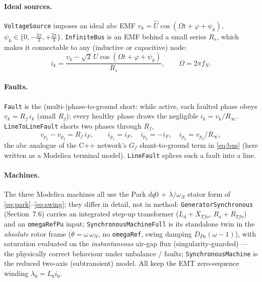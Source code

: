 \documentclass[11pt]{article}
\begin{document}
\paragraph{Ideal sources.} \texttt{VoltageSource} imposes an ideal abc EMF
$v_k=\hat U\cos(\Omega t+\varphi+\psi_k)$, $\psi_k\in\{0,-\tfrac{2\pi}{3},
+\tfrac{2\pi}{3}\}$. \texttt{InfiniteBus} is an EMF behind a small series $R_s$,
which makes it connectable to any (inductive or capacitive) node:
\begin{equation}
i_k=\frac{v_k-\sqrt2\,U\cos(\Omega t+\varphi+\psi_k)}{R_s},
\qquad \Omega=2\pi f_N .
\label{eq:infbus}
\end{equation}

\paragraph{Faults.} \texttt{Fault} is the (multi-)phase-to-ground short: while
active, each faulted phase obeys $v_k=R_f\,i_k$ (small $R_f$); every healthy phase
draws the negligible $i_k=v_k/R_\infty$. \texttt{LineToLineFault} shorts two
phases through $R_f$,
\begin{equation}
v_{p_1}-v_{p_2}=R_f\,i_F,\qquad i_{p_1}=i_F,\quad i_{p_2}=-i_F,\quad
i_{p_3}=v_{p_3}/R_\infty,
\label{eq:llfault}
\end{equation}
the abc analogue of the C++ network's $G_f$ shunt-to-ground term in
\eqref{eq:bus} (here written as a Modelica terminal model). \texttt{LineFault}
splices such a fault into a line.

\paragraph{Machines.} The three Modelica machines all use the Park $dq0$ +
$\dot\lambda/\omega_N$ stator form of \eqref{eq:park}--\eqref{eq:swing};
they differ in detail, not in method:
\texttt{GeneratorSynchronous} (Section~7.6) carries an integrated step-up
transformer ($L_d{+}X_{Tfo}$, $R_a{+}R_{Tfo}$) and an \texttt{omegaRefPu} input;
\texttt{SynchronousMachineFull} is its standalone twin in the \emph{absolute}
rotor frame ($\dot\theta=\omega\,\omega_N$, no \texttt{omegaRef}, swing damping
$D_{Pu}(\omega-1)$), with saturation evaluated on the \emph{instantaneous} air-gap
flux (singularity-guarded) --- the physically correct behaviour under unbalance /
faults; \texttt{SynchronousMachine} is the reduced two-axis (subtransient) model.
All keep the EMT zero-sequence winding $\lambda_0=L_0 i_0$.

\end{document}
